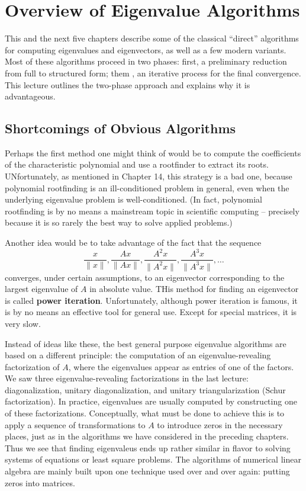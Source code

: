 \chapter{Overview of Eigenvalue Algorithms}
This and the next five chapters describe some of the classical ``direct'' algorithms for computing eigenvalues and eigenvectors, as well as a few modern variants. Most of these algorithms proceed in two phases: first, a preliminary reduction from full to structured form; them , an iterative process for the final convergence. This lecture outlines the two-phase approach and explains why it is advantageous. 

\section{Shortcomings of Obvious Algorithms}
Perhaps the first method one might think of would be to compute the coefficients of the characteristic polynomial and use a rootfinder to extract its roots. UNfortunately, as mentioned in Chapter 14, this strategy is a bad one, because polynomial rootfinding is an ill-conditioned problem in general, even when the underlying eigenvalue problem is well-conditioned. (In fact, polynomial rootfinding is by no means a mainstream topic in scientific computing -- precisely because it is so rarely the best way to solve applied problems.)  

Another idea would be to take advantage of the fact that the sequence
\[
\frac{x}{\|x\|}, \frac{Ax}{\|Ax\|}, \frac{A^2x}{\|A^2x\|}, \frac{A^3x}{\|A^3x\|},\ldots  
\] 
converges, under certain assumptions, to an eigenvector corresponding to the largest eigenvalue of $A$ in absolute value. THis method for finding an eigenvector is called \textbf{power iteration}. Unfortunately, although power iteration is famous, it is by no means an effective tool for general use. Except for special matrices, it is very slow.  

Instead of ideas like these, the best general purpose eigenvalue algorithms are based on a different principle: the computation of an eigenvalue-revealing factorization of $A$, where the eigenvalues appear as entries of one of the factors. We saw three eigenvalue-revealing factorizations in the last lecture: diagonalization, unitary diagonalization, and unitary triangularization (Schur factorization). In practice, eigenvalues are usually computed by constructing one of these factorizations. Conceptually, what must be done to achieve this is to apply a sequence of transformations to $A$ to introduce zeros in the necessary places, just as in the algorithms we have considered in the preceding chapters. Thus we see that finding eigenvaleus ends up rather similar in flavor to solving systems of equations or least square problems. The algorithms of numerical linear algebra are mainly built upon one technique used over and over again: putting zeros into matrices. 

